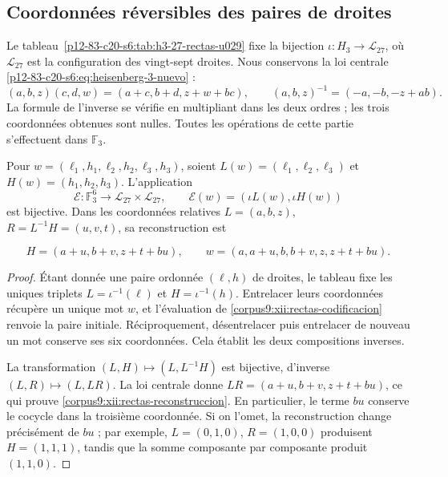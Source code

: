 \subsection{Coordonnées réversibles des paires de droites}
\label{corpus9:xii:rectas-coordenadas}

Le tableau~\ref{p12-83-c20-s6:tab:h3-27-rectas-u029} fixe la bijection
\(\iota:H_3\to\mathscr L_{27}\), où \(\mathscr L_{27}\) est la
configuration des vingt-sept droites. Nous conservons la loi centrale
\eqref{p12-83-c20-s6:eq:heisenberg-3-nuevo} :
\[
 (a,b,z)(c,d,w)=(a+c,b+d,z+w+bc),\qquad
 (a,b,z)^{-1}=(-a,-b,-z+ab).
\]
La formule de l’inverse se vérifie en multipliant dans les deux ordres ;
les trois coordonnées obtenues sont nulles. Toutes les opérations de cette
partie s’effectuent dans \(\mathbb F_3\).

\begin{proposition}
\label{corpus9:xii:rectas-biyeccion}
Pour \(w=(\ell_1,h_1,\ell_2,h_2,\ell_3,h_3)\), soient
\(L(w)=(\ell_1,\ell_2,\ell_3)\) et
\(H(w)=(h_1,h_2,h_3)\). L’application
\begin{equation}
 \mathcal E:\mathbb F_3^6\longrightarrow
                 \mathscr L_{27}\times\mathscr L_{27},\qquad
 \mathcal E(w)=(\iota L(w),\iota H(w))
 \label{corpus9:xii:rectas-codificacion}
\end{equation}
est bijective. Dans les coordonnées relatives
\(L=(a,b,z)\), \(R=L^{-1}H=(u,v,t)\), sa reconstruction est

\begin{equation}
 H=(a+u,b+v,z+t+bu),\qquad
 w=(a,a+u,b,b+v,z,z+t+bu).
 \label{corpus9:xii:rectas-reconstruccion}
\end{equation}
\end{proposition}
\begin{proof}
Étant donnée une paire ordonnée \((\ell,h)\) de droites, le tableau fixe les
uniques triplets \(L=\iota^{-1}(\ell)\) et
\(H=\iota^{-1}(h)\). Entrelacer leurs coordonnées récupère un unique
mot \(w\), et l’évaluation de
\eqref{corpus9:xii:rectas-codificacion} renvoie la paire initiale.
Réciproquement, désentrelacer puis entrelacer de nouveau un mot conserve
ses six coordonnées. Cela établit les deux compositions inverses.

La transformation \((L,H)\mapsto(L,L^{-1}H)\) est bijective, d’inverse
\((L,R)\mapsto(L,LR)\). La loi centrale donne
\(LR=(a+u,b+v,z+t+bu)\), ce qui prouve
\eqref{corpus9:xii:rectas-reconstruccion}. En particulier, le terme
\(bu\) conserve le cocycle dans la troisième coordonnée. Si on l’omet,
la reconstruction change précisément de \(bu\) ; par exemple,
\(L=(0,1,0)\), \(R=(1,0,0)\) produisent
\(H=(1,1,1)\), tandis que la somme composante par composante produit
\((1,1,0)\).
\end{proof}

